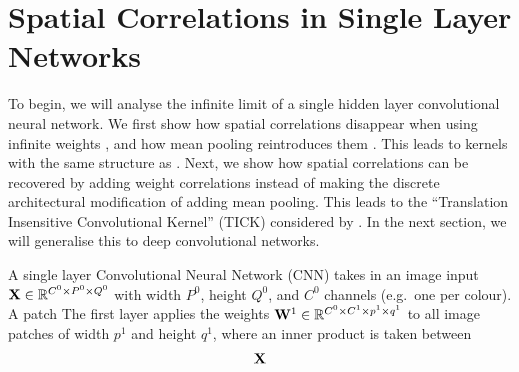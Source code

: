 \documentclass{article}
\begin{document}


\section{Spatial Correlations in Single Layer Networks}
To begin, we will analyse the infinite limit of a single hidden layer convolutional neural network. We first show how spatial correlations disappear when using infinite weights \citet{garriga2018infiniteconv,novak2019infiniteconv}, and how mean pooling reintroduces them \citet{novak2019infiniteconv}. This leads to kernels with the same structure as . Next, we show how spatial correlations can be recovered by adding weight correlations instead of making the discrete architectural modification of adding mean pooling. This leads to the 
``Translation Insensitive Convolutional Kernel'' (TICK) considered by \citet{dutordoir2020}. In the next section, we will generalise this to deep convolutional networks.

A single layer Convolutional Neural Network (CNN) takes in an image input $\mathbf{X} \in \mathbb{R}^{C^0\times P^0\times Q^0}$ with width $P^0$, height $Q^0$, and $C^0$ channels (e.g.~one per colour). A patch 
The first layer applies the weights $\mathbf{W}^1\in\mathbb{R}^{C^0\times C^1\times p^1\times q^1}$ to all image patches of width $p^1$ and height $q^1$, where an inner product is taken between 
\begin{align}
    \mathbf{X}
\end{align}
\end{document}
